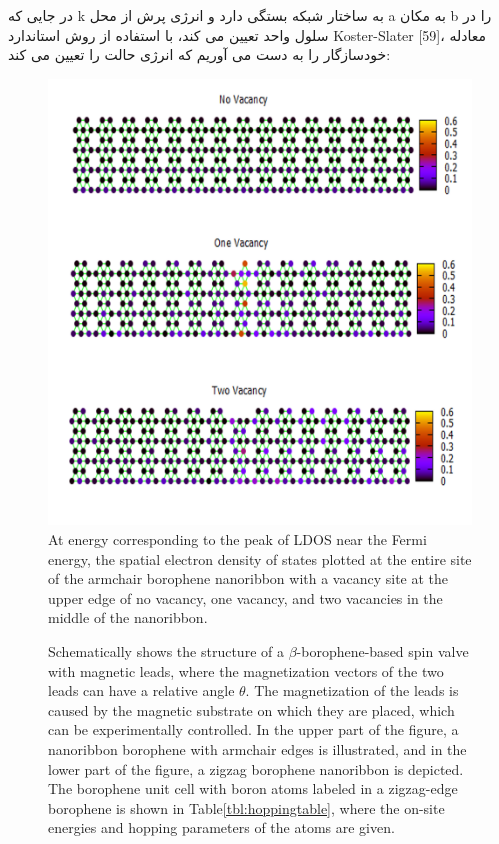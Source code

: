 در جایی که k به ساختار شبکه بستگی دارد و انرژی پرش از محل a به مکان b را در سلول واحد تعیین می کند، با استفاده از روش استاندارد Koster-Slater [59]، معادله خودسازگار را به دست می آوریم که انرژی حالت را تعیین می کند:

\begin{figure}[!ht]
    \centering
    \includegraphics[width=1\linewidth]{./figures/Slide5.PNG}
    \caption{At energy corresponding to the peak of LDOS near the Fermi energy, the spatial electron density of states plotted at the entire site of 
    the armchair borophene nanoribbon with a vacancy site at the upper edge of no vacancy, one vacancy, and two vacancies in the middle of the nanoribbon.}
    \label{armVSLDOS}
  \end{figure}

  \begin{figure}
    \caption{Schematically shows the structure of a $\beta$-borophene-based spin valve with magnetic leads, where the magnetization vectors of the two leads can have a relative angle $\theta$. The magnetization of the leads is caused by the magnetic substrate on which they are placed, which can be experimentally controlled. In the upper part of the figure, a nanoribbon borophene with armchair edges is illustrated, and in the lower part of the figure, a zigzag borophene nanoribbon is depicted. The borophene unit cell with boron atoms labeled in a zigzag-edge borophene is shown in Table\ref{tbl:hoppingtable}, where the on-site energies and hopping parameters of the atoms are given.}
    \label{fig:model}
    \end{figure}
    
